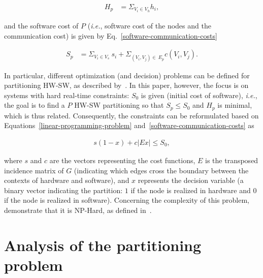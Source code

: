 \documentclass{doublecol-new}
\theoremstyle{TH}{
\newtheorem{lemma}{Lemma}
\newtheorem{theorem}[lemma]{Theorem}
\newtheorem{corrolary}[lemma]{Corrolary}
\newtheorem{conjecture}[lemma]{Conjecture}
\newtheorem{proposition}[lemma]{Proposition}
\newtheorem{claim}[lemma]{Claim}
\newtheorem{stheorem}[lemma]{Wrong Theorem}
\newtheorem{algorithm}{Algorithm}
}
\theoremstyle{THrm}{
\newtheorem{definition}{Definition}[section]
\newtheorem{question}{Question}[section]
\newtheorem{remark}{Remark}
\newtheorem{scheme}{Scheme}
}
\theoremstyle{THhit}{
\newtheorem{case}{Case}[section]
}
\begin{document}
\vspace{-5 mm}
\begin{align}
\label{hardware-costs}
H_p  &= \Sigma_{V_i \in V_h} h_i,
\end{align}

\vspace{2 mm}
\noindent
and the software cost of $P$ ({\it i.e.}, software cost of the nodes and the communication cost) is given by Eq.~\eqref{software-communication-costs}

\vspace{-3 mm}
\begin{align}
\label{software-communication-costs}
  S_p &= \Sigma_{V_i \in V_s}\:s_i + \Sigma_{(V_i,V_j)\in\:E_p} c(V_i,V_j).
\end{align}

\vspace{2 mm}
In particular, different optimization (and decision) problems can be defined for partitioning HW-SW, as described by~\cite{Arato2003}. In this paper, however, the focus is on systems with hard real-time constraints: $ S_0 $ is given (initial cost of software), {\it i.e.}, the goal is to find a $P$ HW-SW partitioning so that $ S_p \leq S_0 $ and $ H_p $ is minimal, which is thus related. Consequently, the constraints can be reformulated based on Equations~\eqref{linear-programming-problem} and~\eqref{software-communication-costs} as 

\vspace{-2 mm}
\begin{align}
\label{hw-sw-partitioning}
s\left(1-x\right) + c|Ex| \leq S_0, 
\end{align}

\vspace{2 mm}
\noindent where $s$ and $c$ are the vectors representing the cost functions, $E$ is the transposed incidence matrix of $G$ (indicating which edges cross the boundary between the contexts of hardware and software), and $x$ represents the decision variable (a binary vector indicating the partition: $1$ if the node is realized in hardware and $0$ if the node is realized in software). Concerning the complexity of this problem, \cite{Arato2003} demonstrate that it is NP-Hard, as defined in~\cite{Cormem}.

\section{Analysis of the partitioning problem}
\label{Analysis-of-the-partitioning-problem-using-ESBMC}
\end{document}
